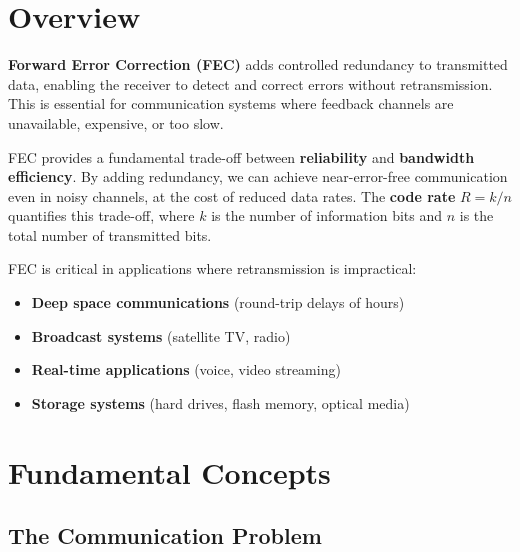 \section{Overview}

\textbf{Forward Error Correction (FEC)} adds controlled redundancy to transmitted data, enabling the receiver to detect and correct errors without retransmission. This is essential for communication systems where feedback channels are unavailable, expensive, or too slow.

\begin{keyconcept}
FEC provides a fundamental trade-off between \textbf{reliability} and \textbf{bandwidth efficiency}. By adding redundancy, we can achieve near-error-free communication even in noisy channels, at the cost of reduced data rates. The \textbf{code rate} $R = k/n$ quantifies this trade-off, where $k$ is the number of information bits and $n$ is the total number of transmitted bits.
\end{keyconcept}

FEC is critical in applications where retransmission is impractical:
\begin{itemize}
\item \textbf{Deep space communications} (round-trip delays of hours)
\item \textbf{Broadcast systems} (satellite TV, radio)
\item \textbf{Real-time applications} (voice, video streaming)
\item \textbf{Storage systems} (hard drives, flash memory, optical media)
\end{itemize}

\section{Fundamental Concepts}

\subsection{The Communication Problem}

